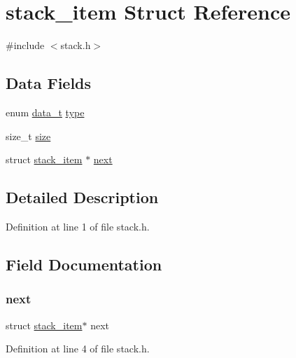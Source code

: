 \hypertarget{structstack__item}{}\section{stack\+\_\+item Struct Reference}
\label{structstack__item}


{\ttfamily \#include $<$stack.\+h$>$}

\subsection*{Data Fields}
\begin{DoxyCompactItemize}
\item 
enum \mbox{\hyperlink{hashtable_8h_adb5f3584b941a8dc0fed6b7302b4b8eb}{data\+\_\+t}} \mbox{\hyperlink{structstack__item_a0c6169f5c94682132bbbe974784559e6}{type}}
\item 
size\+\_\+t \mbox{\hyperlink{structstack__item_a854352f53b148adc24983a58a1866d66}{size}}
\item 
struct \mbox{\hyperlink{structstack__item}{stack\+\_\+item}} $\ast$ \mbox{\hyperlink{structstack__item_a0bd53e44edb84db0a4f76ab6d57b7a18}{next}}
\end{DoxyCompactItemize}


\subsection{Detailed Description}


Definition at line 1 of file stack.\+h.



\subsection{Field Documentation}
\mbox{\label{structstack__item_a0bd53e44edb84db0a4f76ab6d57b7a18}} 
\subsubsection{\texorpdfstring{next}{next}}
{\footnotesize\ttfamily struct \mbox{\hyperlink{structstack__item}{stack\+\_\+item}}$\ast$ next}



Definition at line 4 of file stack.\+h.

\mbox{\label{structstack__item_a854352f53b148adc24983a58a1866d66}} 
